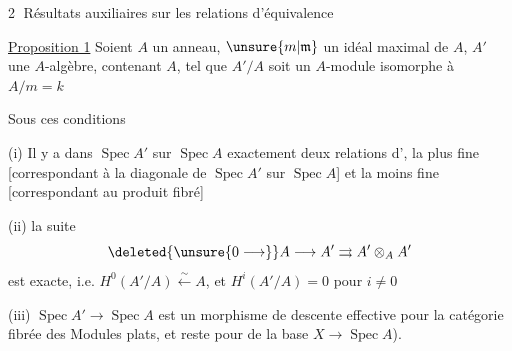 \textcircled{2} Résultats auxiliaires sur les relations d'équivalence

\uline{Proposition 1} \quad Soient $A$ un anneau, $\unsure{m|\mathfrak m}$ un idéal maximal de $A$, $A'$ une $A$-algèbre, contenant $A$, tel que $A'/A$ soit un $A$-module isomorphe à $A/m=k$

Sous ces conditions

(i) Il y a dans $\operatorname{Spec}A'$ sur $\operatorname{Spec}A$ exactement deux relations d', la plus fine  [correspondant à la diagonale de $\operatorname{Spec}A'$ sur $\operatorname{Spec} A$] et la moins fine [correspondant au produit fibré]

(ii) la suite
\[
\deleted{\unsure{0\longrightarrow}}A\longrightarrow A'\rightrightarrows A'\otimes_A A'
\]
est exacte,  i.e. $H^0(A'/A)\xleftarrow{\sim}A$, et $H^i(A'/A)=0$ pour $i\ne0$

(iii) $\operatorname{Spec}A'\longrightarrow\operatorname{Spec}A$ est un morphisme de descente effective pour la catégorie fibrée des Modules  plats, et reste  pour   de la base $X\longrightarrow\operatorname{Spec}A$).

